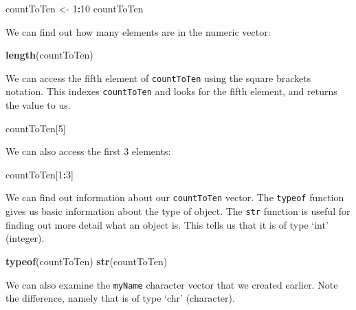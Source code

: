 \documentclass[]{article}
\newenvironment{Shaded}{\begin{snugshade}}{\end{snugshade}}
\newcommand{\DecValTok}[1]{\textcolor[rgb]{0.00,0.00,0.81}{#1}}
\newcommand{\KeywordTok}[1]{\textcolor[rgb]{0.13,0.29,0.53}{\textbf{#1}}}
\newcommand{\NormalTok}[1]{#1}
\newcommand{\OperatorTok}[1]{\textcolor[rgb]{0.81,0.36,0.00}{\textbf{#1}}}
\newcommand{\StringTok}[1]{\textcolor[rgb]{0.31,0.60,0.02}{#1}}
\begin{document}
\begin{Shaded}
\begin{Highlighting}[]
\NormalTok{countToTen <-}\StringTok{ }\DecValTok{1}\OperatorTok{:}\DecValTok{10}
\NormalTok{countToTen}
\end{Highlighting}
\end{Shaded}

We can find out how many elements are in the numeric vector:

\begin{Shaded}
\begin{Highlighting}[]
\KeywordTok{length}\NormalTok{(countToTen)}
\end{Highlighting}
\end{Shaded}

We can access the fifth element of \texttt{countToTen} using the square
brackets notation. This indexes \texttt{countToTen} and looks for the
fifth element, and returns the value to us.

\begin{Shaded}
\begin{Highlighting}[]
\NormalTok{countToTen[}\DecValTok{5}\NormalTok{]}
\end{Highlighting}
\end{Shaded}

We can also access the first 3 elements:

\begin{Shaded}
\begin{Highlighting}[]
\NormalTok{countToTen[}\DecValTok{1}\OperatorTok{:}\DecValTok{3}\NormalTok{]}
\end{Highlighting}
\end{Shaded}

We can find out information about our \texttt{countToTen} vector. The
\texttt{typeof} function gives us basic information about the type of
object. The \texttt{str} function is useful for finding out more detail
what an object is. This tells us that it is of type `int' (integer).

\begin{Shaded}
\begin{Highlighting}[]
\KeywordTok{typeof}\NormalTok{(countToTen)}
\KeywordTok{str}\NormalTok{(countToTen)}
\end{Highlighting}
\end{Shaded}

We can also examine the \texttt{myName} character vector that we created
earlier. Note the difference, namely that is of type `chr' (character).
\end{document}
